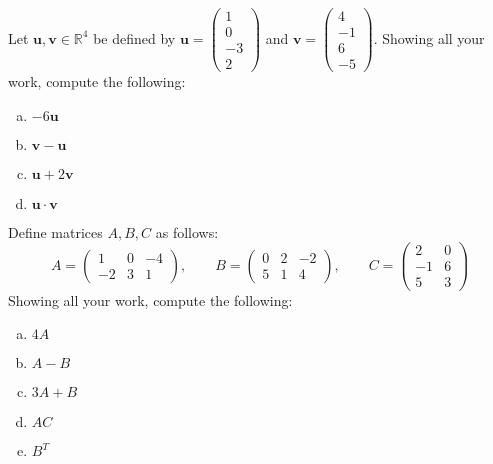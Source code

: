\documentclass[11pt,letterpaper]{article}
\begin{document}

 Let $\mathbf{u}, \mathbf{v} \in \mathbb{R}^4$ be defined by $\mathbf{u}= \begin{pmatrix} 1 \\ 0 \\ -3 \\ 2 \end{pmatrix}$ and $\mathbf{v}= \begin{pmatrix} 4 \\ -1 \\ 6 \\ -5 \end{pmatrix}$. Showing all your work, compute the following:
	\begin{enumerate}[(a)]
	\item $-6 \mathbf{u}$
	\item $\mathbf{v} - \mathbf{u}$
	\item $\mathbf{u} + 2 \mathbf{v}$
	\item $\mathbf{u} \cdot \mathbf{v}$
	\end{enumerate}



\newpage



 Define matrices $A, B, C$ as follows:
	\[
	A= \begin{pmatrix} 1 & 0 & -4 \\ -2 & 3 & 1 \end{pmatrix}, \qquad B= \begin{pmatrix} 0 & 2 & -2 \\ 5 & 1 & 4 \end{pmatrix}, \qquad C= \begin{pmatrix} 2 & 0 \\ -1 & 6 \\ 5 & 3 \end{pmatrix}
	\]
Showing all your work, compute the following:
	\begin{enumerate}[(a)]
	\item $4A$
	\item $A - B$
	\item $3A + B$
	\item $AC$
	\item $B^T$
	\end{enumerate}



\newpage
\end{document}
